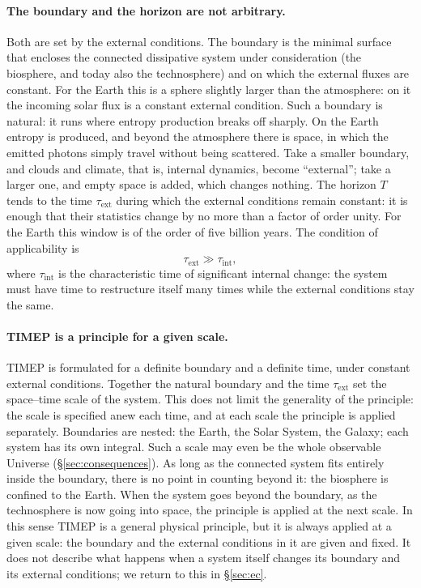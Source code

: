 \documentclass[11pt,a4paper]{article}
\newcommand{\Sref}[1]{\hyperref[#1]{\S\ref{#1}}}
\begin{document}
\paragraph{The boundary and the horizon are not arbitrary.}
Both are set by the external conditions. The boundary is the minimal surface that encloses the connected dissipative system under consideration (the biosphere, and today also the technosphere) and on which the external fluxes are constant. For the Earth this is a sphere slightly larger than the atmosphere: on it the incoming solar flux is a constant external condition. Such a boundary is natural: it runs where entropy production breaks off sharply. On the Earth entropy is produced, and beyond the atmosphere there is space, in which the emitted photons simply travel without being scattered. Take a smaller boundary, and clouds and climate, that is, internal dynamics, become ``external''; take a larger one, and empty space is added, which changes nothing. The horizon $T$ tends to the time $\tau_{\mathrm{ext}}$ during which the external conditions remain constant: it is enough that their statistics change by no more than a factor of order unity. For the Earth this window is of the order of five billion years. The condition of applicability is
\begin{equation}
\tau_{\mathrm{ext}}\gg\tau_{\mathrm{int}},
\end{equation}
where $\tau_{\mathrm{int}}$ is the characteristic time of significant internal change: the system must have time to restructure itself many times while the external conditions stay the same.

\paragraph{TIMEP is a principle for a given scale.}
TIMEP is formulated for a definite boundary and a definite time, under constant external conditions. Together the natural boundary and the time $\tau_{\mathrm{ext}}$ set the space--time scale of the system. This does not limit the generality of the principle: the scale is specified anew each time, and at each scale the principle is applied separately. Boundaries are nested: the Earth, the Solar System, the Galaxy; each system has its own integral. Such a scale may even be the whole observable Universe (\Sref{sec:consequences}). As long as the connected system fits entirely inside the boundary, there is no point in counting beyond it: the biosphere is confined to the Earth. When the system goes beyond the boundary, as the technosphere is now going into space, the principle is applied at the next scale. In this sense TIMEP is a general physical principle, but it is always applied at a given scale: the boundary and the external conditions in it are given and fixed. It does not describe what happens when a system itself changes its boundary and its external conditions; we return to this in \Sref{sec:ec}.
\end{document}
